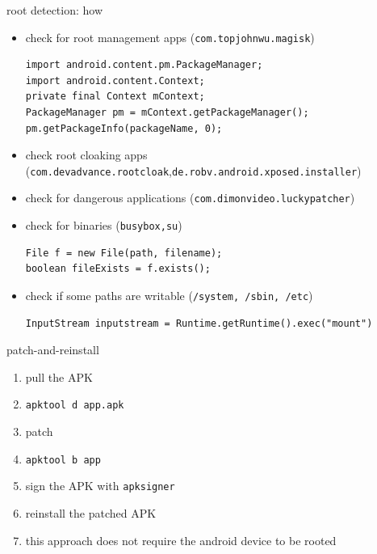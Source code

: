 \documentclass{beamer}
\begin{document}


\begin{frame}[fragile]{root detection: how}

    \begin{itemize}[<+->]
        \item check for root management apps (\texttt{com.topjohnwu.magisk})
              \begin{verbatim}
import android.content.pm.PackageManager;
import android.content.Context;
private final Context mContext;
PackageManager pm = mContext.getPackageManager();
pm.getPackageInfo(packageName, 0);
\end{verbatim}
        \item check root cloaking apps {\small (\texttt{com.devadvance.rootcloak},\texttt{de.robv.android.xposed.installer})}
        \item check for dangerous applications (\texttt{com.dimonvideo.luckypatcher})
        \item check for binaries (\texttt{busybox,su})
              \begin{verbatim}
File f = new File(path, filename);
boolean fileExists = f.exists();
\end{verbatim}
        \item check if some paths are writable (\texttt{/system, /sbin, /etc})
              \begin{verbatim}
InputStream inputstream = Runtime.getRuntime().exec("mount")
\end{verbatim}
    \end{itemize}

\end{frame}

\begin{frame}{patch-and-reinstall}

    \begin{enumerate}[<+->]
        \item pull the APK
        \item {\footnotesize \texttt{apktool d app.apk}}
        \item patch
        \item {\footnotesize \texttt{apktool b app}}
        \item sign the APK with {\footnotesize \texttt{apksigner}}
        \item reinstall the patched APK
        \item this approach does not require the android device to be rooted
    \end{enumerate}

\end{frame}
\end{document}
